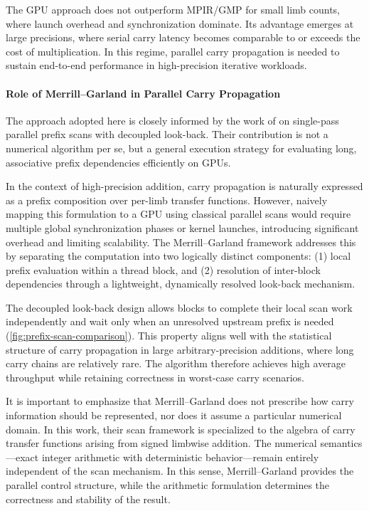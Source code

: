 The GPU approach does not outperform MPIR/GMP for small limb
counts, where launch overhead and synchronization dominate. Its advantage
emerges at large precisions, where serial carry latency becomes comparable to
or exceeds the cost of multiplication. In this regime, parallel carry
propagation is needed to sustain end-to-end performance in
high-precision iterative workloads.

\paragraph{Role of Merrill--Garland in Parallel Carry Propagation}

The approach adopted here is closely informed by the work of
\cite{merrill2016single} on single-pass parallel prefix scans with decoupled
look-back. Their contribution is not a numerical
algorithm per se, but a general execution strategy for evaluating long,
associative prefix dependencies efficiently on GPUs.

In the context of high-precision addition, carry propagation is naturally
expressed as a prefix composition over per-limb transfer functions. However,
naively mapping this formulation to a GPU using classical parallel scans would
require multiple global synchronization phases or kernel launches, introducing
significant overhead and limiting scalability. The Merrill--Garland framework
addresses this by separating the computation into two logically distinct
components: (1) local prefix evaluation within a thread block, and (2)
resolution of inter-block dependencies through a lightweight, dynamically
resolved look-back mechanism.

The decoupled look-back design allows blocks to complete their local
scan work independently and wait only when an unresolved upstream prefix is
needed (\cref{fig:prefix-scan-comparison}). This property aligns well with the statistical structure of
carry propagation in large arbitrary-precision additions, where long carry
chains are relatively rare. The algorithm therefore achieves high average
throughput while retaining correctness in worst-case carry scenarios.

It is important to emphasize that Merrill--Garland does not prescribe how carry
information should be represented, nor does it assume a particular numerical
domain. In this work, their scan framework is specialized to the algebra of
carry transfer functions arising from signed limbwise addition. The numerical
semantics---exact integer arithmetic with deterministic behavior---remain
entirely independent of the scan mechanism. In this sense, Merrill--Garland
provides the parallel control structure, while the arithmetic formulation
determines the correctness and stability of the result.

